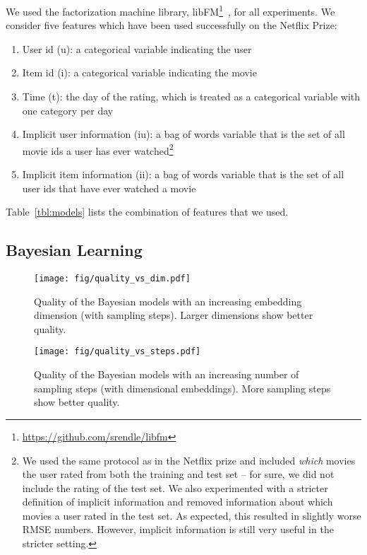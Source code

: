 \documentclass{article}
\begin{document}
We used the factorization machine library, libFM\footnote{\url{https://github.com/srendle/libfm}}~\cite{rendle:tist12}, for all experiments.
We consider five features which have been used successfully on the Netflix Prize:
\begin{enumerate}
    \item User id (u): a categorical variable indicating the user
    \item Item id (i): a categorical variable indicating the movie
    \item Time (t): the day of the rating, which is treated as a categorical variable with one category per day
    \item Implicit user information (iu): a bag of words variable that is the set of all movie ids a user has ever watched\footnote{We used the same protocol as in the Netflix prize and included \emph{which} movies the user rated from both the training and test set -- for sure, we did not include the rating of the test set. We also experimented with a stricter definition of implicit information and removed information about which movies a user rated in the test set. As expected, this resulted in slightly worse RMSE numbers. However, implicit information is still very useful in the stricter setting.}
    \item Implicit item information (ii): a bag of words variable that is the set of all user ids that have ever watched a movie
\end{enumerate}
Table~\ref{tbl:models} lists the combination of features that we used.



\subsection{Bayesian Learning}



\begin{figure}[t]
    \centering
    \texttt{[image: fig/quality\_vs\_dim.pdf]}
    \caption{Quality of the Bayesian models with an increasing embedding dimension (with  sampling steps). Larger dimensions show better quality.}
    \label{fig:ml10m_quality_vs_dim}
\end{figure}

\begin{figure}[t]
    \centering
    \texttt{[image: fig/quality\_vs\_steps.pdf]}
    \caption{Quality of the Bayesian models with an increasing number of sampling steps (with  dimensional embeddings). More sampling steps show better quality.}
    \label{fig:ml10m_quality_vs_steps}
\end{figure}
\end{document}
